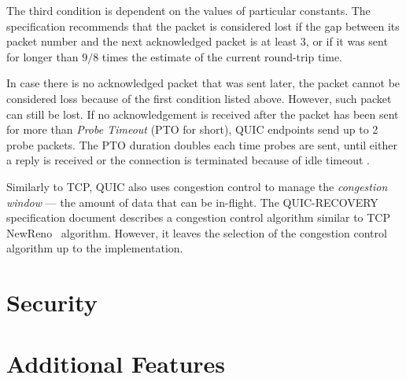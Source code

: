 The third condition is dependent on the values of particular constants. The specification recommends
that the packet is considered lost if the gap between its packet number and the next acknowledged
packet is at least 3, or if it was sent for longer than $9/8$ times the estimate of the current
round-trip time.

In case there is no acknowledged packet that was sent later, the packet cannot be considered loss
because of the first condition listed above. However, such packet can still be lost. If no
acknowledgement is received after the packet has been sent for more than \textit{Probe Timeout} (PTO
for short), QUIC endpoints send up to 2 probe packets. The PTO duration doubles each time probes are
sent, until either a reply is received or the connection is terminated because of idle timeout
.

Similarly to TCP, QUIC also uses congestion control to manage the \textit{congestion window} --- the
amount of data that can be in-flight. The QUIC-RECOVERY specification document describes a
congestion control algorithm similar to TCP NewReno~\cite{rfc6582} algorithm.
However, it leaves the selection of the congestion control algorithm up to the implementation.

\section{Security}

\section{Additional Features}


